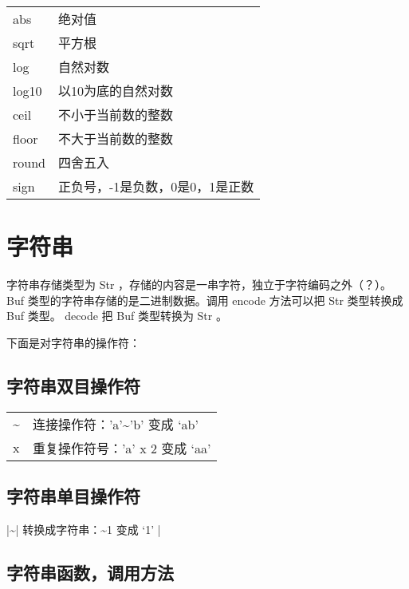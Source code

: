 \documentclass{ctexart}
\begin{document}
\begin{center}
\begin{tabular}{ll}
 abs    &  绝对值                           \\
 sqrt   &  平方根                           \\
 log    &  自然对数                         \\
 log10  &  以10为底的自然对数               \\
 ceil   &  不小于当前数的整数               \\
 floor  &  不大于当前数的整数               \\
 round  &  四舍五入                         \\
 sign   &  正负号，-1是负数，0是0，1是正数  \\
\end{tabular}
\end{center}
\section{字符串}
\label{sec-4}

字符串存储类型为 Str ，存储的内容是一串字符，独立于字符编码之外（？）。
Buf 类型的字符串存储的是二进制数据。调用 encode 方法可以把 Str 类型转换成
 Buf 类型。 decode 把 Buf 类型转换为 Str 。

下面是对字符串的操作符：
\subsection{字符串双目操作符}
\label{sec-4-1}


\begin{center}
\begin{tabular}{ll}
 \~{}  &  连接操作符：'a'\~{}'b' 变成 `ab'  \\
 x     &  重复操作符号：'a' x 2 变成 `aa'   \\
\end{tabular}
\end{center}
\subsection{字符串单目操作符}
\label{sec-4-2}

|\~{}| 转换成字符串：\~{}1 变成 `1'   |
\subsection{字符串函数，调用方法}
\label{sec-4-3}
\end{document}
